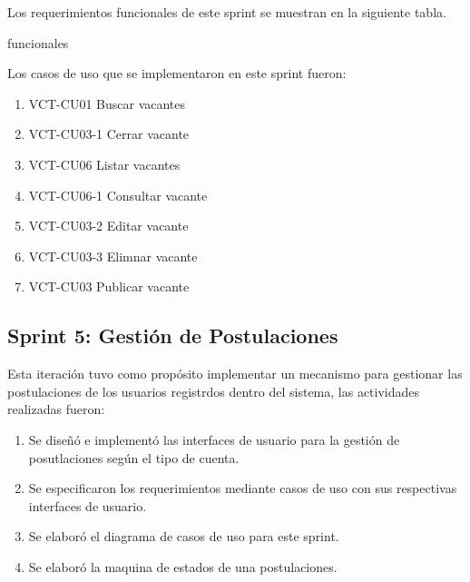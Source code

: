 Los requerimientos funcionales de este sprint se muestran en la siguiente tabla.
\begin{requerimientos}{funcionales}
\end{requerimientos}

Los casos de uso que se implementaron en este sprint fueron:
\begin{enumerate}
    \item VCT-CU01 Buscar vacantes
    \item VCT-CU03-1 Cerrar vacante
    \item VCT-CU06 Listar vacantes
    \item VCT-CU06-1 Consultar vacante
    \item VCT-CU03-2 Editar vacante
    \item VCT-CU03-3 Elimnar vacante
    \item VCT-CU03 Publicar vacante
\end{enumerate} 



\subsection{Sprint 5: Gestión de Postulaciones}

Esta iteración tuvo como propósito implementar un mecanismo para gestionar las postulaciones de los usuarios registrdos dentro del 
sistema, las actividades realizadas fueron:
\begin{enumerate}
    \item Se diseñó e implementó las interfaces de usuario para la gestión de posutlaciones según el tipo de cuenta.
    \item Se especificaron los requerimientos mediante casos de uso con sus respectivas interfaces de usuario.
    \item Se elaboró el diagrama de casos de uso para este sprint.
    \item Se elaboró la maquina de estados de una postulaciones.
\end{enumerate} 

